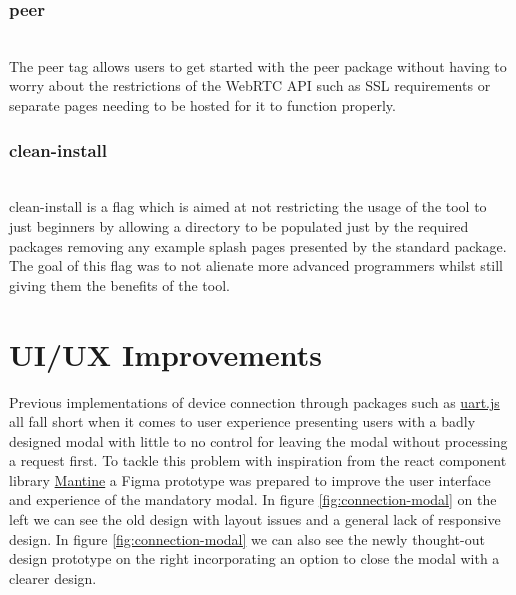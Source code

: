 \documentclass{l4proj}
\begin{document}
\subsubsection{peer}\hfill\\
The peer tag allows users to get started with the peer package without having to worry about the restrictions of the WebRTC API such as SSL requirements or separate pages needing to be hosted for it to function properly.



\subsubsection{clean-install}\hfill\\
clean-install is a flag which is aimed at not restricting the usage of the tool to just beginners by allowing a directory to be populated just by the required packages removing any example splash pages presented by the standard package. The goal of this flag was to not alienate more advanced programmers whilst still giving them the benefits of the tool.

\section{UI/UX Improvements}
Previous implementations of device connection through packages such as \href{https://www.espruino.com/UART.js}{uart.js} all fall short when it comes to user experience presenting users with a badly designed modal with little to no control for leaving the modal without processing a request first. To tackle this problem with inspiration from the react component library \href{https://mantine.dev/}{Mantine} a Figma prototype was prepared to improve the user interface and experience of the mandatory modal. In figure \ref{fig:connection-modal} on the left we can see the old design with layout issues and a general lack of responsive design. In figure \ref{fig:connection-modal} we can also see the newly thought-out design prototype on the right incorporating an option to close the modal with a clearer design. 
\end{document}
